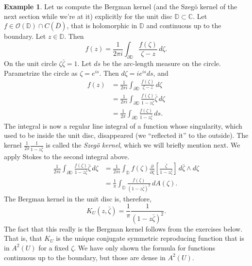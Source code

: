 \documentclass[12pt,openany]{book}
\newcommand{\C}{{\mathbb{C}}}
\newcommand{\D}{{\mathbb{D}}}
\newcommand{\sO}{{\mathscr{O}}}
\theoremstyle{plain}
\theoremstyle{remark}
\theoremstyle{definition}
\theoremstyle{exercise}
\theoremstyle{example}
\newtheorem{example}[thm]{Example}
\begin{document}
\begin{example}
%
%
Let us compute the Bergman kernel (and
the Szeg{\"o} kernel of the next section while we're at it)
explicitly for the
unit disc $\D \subset \C$.  Let $f \in \sO(\D) \cap C(\overline{D})$, that
is holomorphic in $\D$ and continuous up to the boundary.
Let $z \in \D$.
Then
\begin{equation*}
f(z) = \frac{1}{2\pi i} \int_{\partial \D} \frac{f(\zeta)}{\zeta-z} \,
d\zeta .
\end{equation*}
On the unit circle $\zeta \bar{\zeta} = 1$.  Let $ds$ be
the arc-length measure on the circle.  Parametrize the circle as $\zeta =
e^{is}$.
Then $d\zeta = i e^{is} ds$, and 
\begin{equation*}
\begin{split}
f(z) &= \frac{1}{2\pi i} \int_{\partial \D} \frac{f(\zeta)}{\zeta-z} \,
d\zeta \\
&= \frac{1}{2\pi i} \int_{\partial \D} \frac{f(\zeta)}{1-z\bar{\zeta}}
\bar{\zeta} \, d\zeta \\
&= \frac{1}{2\pi} \int_{\partial \D} \frac{f(\zeta)}{1-z\bar{\zeta}} \, ds .
\end{split}
\end{equation*}
The integral is now a regular line integral of a function whose
singularity, which used to be inside the unit disc, disappeared (we 
``reflected it'' to the outside).  The kernel 
$\frac{1}{2\pi} \frac{1}{1-z\bar{\zeta}}$ is called the
\emph{Szeg{\"o} kernel}, which we
will briefly mention next.  We apply Stokes to the second integral above.
\begin{equation*}
\begin{split}
\frac{1}{2\pi i} \int_{\partial \D} \frac{f(\zeta)}{1-z\bar{\zeta}}
\bar{\zeta} \, d\zeta 
&=
\frac{1}{2\pi i} \int_{\D} f(\zeta)
\frac{\partial}{\partial \bar{\zeta}} \left[
\frac{\bar{\zeta}}{1-z\bar{\zeta}} \right] \,
d\bar{\zeta} \wedge d\zeta 
\\
&=
\frac{1}{\pi} \int_{\D} 
\frac{f(\zeta)}{{(1-z\bar{\zeta})}^2} \, dA(\zeta) .
\end{split}
\end{equation*}
The Bergman kernel in the unit disc is, therefore,
\begin{equation*}
K_U(z,\bar{\zeta}) = \frac{1}{\pi} \frac{1}{{(1-z\bar{\zeta})}^2} .
\end{equation*}
The fact that this really is the Bergman kernel follows from the exercises
below.  That is, that $K_U$ is the unique conjugate symmetric
reproducing function that is in
$A^2(U)$ for a fixed $\zeta$.  
We have only shown the formula for functions continuous up to the boundary,
but those are dense in $A^2(U)$.
\end{example}
\end{document}
